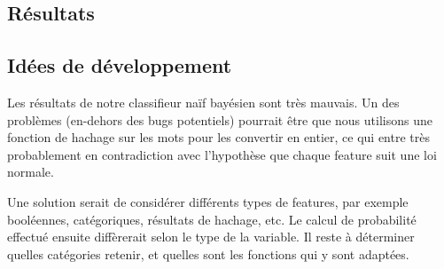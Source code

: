 \documentclass[french, 14pt]{memoir}
\begin{document}
\subsection{Résultats}


\subsection{Idées de développement}

Les résultats de notre classifieur naïf bayésien sont très mauvais. Un des problèmes (en-dehors des bugs potentiels) pourrait être que nous utilisons une fonction de hachage sur les mots pour les convertir en entier, ce qui entre très probablement en contradiction avec l'hypothèse que chaque feature suit une loi normale.

Une solution serait de considérer différents types de features, par exemple booléennes, catégoriques, résultats de hachage, etc. Le calcul de probabilité effectué ensuite diffèrerait selon le type de la variable. Il reste à déterminer quelles catégories retenir, et quelles sont les fonctions qui y sont adaptées.
\end{document}
